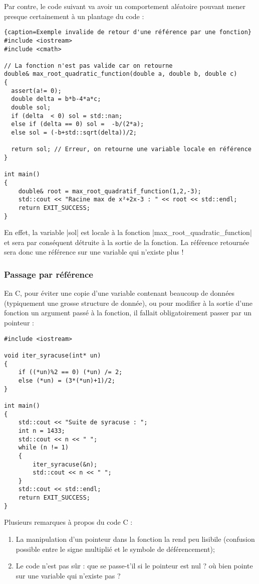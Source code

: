 Par contre, le code suivant va avoir un comportement aléatoire pouvant mener presque certainement à un plantage du code :

\begin{lstlisting}{caption=Exemple invalide de retour d'une référence par une fonction}
#include <iostream>
#include <cmath>

// La fonction n'est pas valide car on retourne 
double& max_root_quadratic_function(double a, double b, double c)
{
  assert(a!= 0);
  double delta = b*b-4*a*c;
  double sol;
  if (delta  < 0) sol = std::nan;
  else if (delta == 0) sol =  -b/(2*a);
  else sol = (-b+std::sqrt(delta))/2;

  return sol; // Erreur, on retourne une variable locale en référence
}

int main()
{
    double& root = max_root_quadratif_function(1,2,-3);
    std::cout << "Racine max de x²+2x-3 : " << root << std::endl;
    return EXIT_SUCCESS;
}
\end{lstlisting}

En effet, la variable |sol| est locale à la fonction |max\_root\_quadratic\_function| et sera par conséquent détruite à la sortie de la fonction. La référence retournée sera donc une référence sur une variable qui n'existe plus !

\subsubsection{Passage par référence}

En C, pour éviter une copie d'une variable contenant beaucoup de données (typiquement une grosse structure de donnée), ou pour modifier à la sortie d'une fonction un argument passé à la fonction, il fallait obligatoirement passer par un pointeur :

\begin{lstlisting}[caption=fonction C avec modification des arguments d'entrée]
#include <iostream>

void iter_syracuse(int* un)
{
    if ((*un)%2 == 0) (*un) /= 2;
    else (*un) = (3*(*un)+1)/2;
}

int main()
{
    std::cout << "Suite de syracuse : ";
    int n = 1433;
    std::cout << n << " ";
    while (n != 1)
    {
        iter_syracuse(&n);
        std::cout << n << " ";
    }
    std::cout << std::endl;
    return EXIT_SUCCESS;
}
\end{lstlisting}

Plusieurs remarques à propos du code C :
\begin{enumerate}
    \item La manipulation d'un pointeur dans la fonction la rend peu lisibile (confusion possible entre le signe multiplié et le symbole de déférencement);
    \item Le code n'est pas sûr : que se passe-t'il si le pointeur est nul ? où bien pointe sur une variable qui n'existe pas ?
\end{enumerate}

